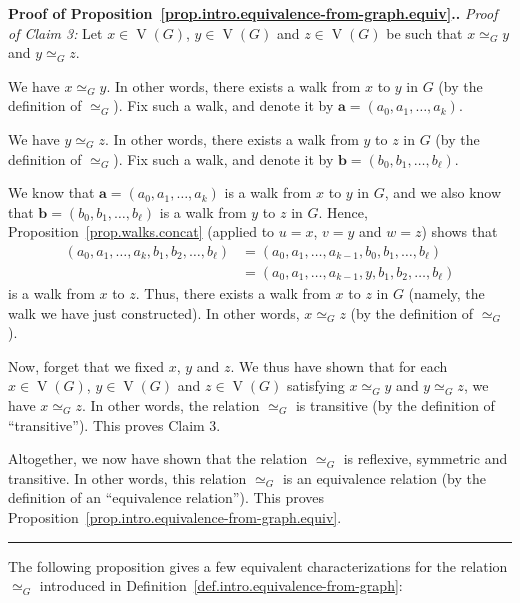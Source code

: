 \documentclass[numbers=enddot,12pt,final,onecolumn,notitlepage]{scrartcl}%
\theoremstyle{definition}
\newenvironment{proof}[1][Proof]{\noindent\textbf{#1.} }{\ \rule{0.5em}{0.5em}}
\newcommand{\tup}[1]{\left( #1 \right)}
\newcommand{\verts}[1]{\operatorname{V}\left( #1 \right)}
\begin{document}
\begin{proof}[Proof of
Proposition~\ref{prop.intro.equivalence-from-graph.equiv}.]
\textit{Proof of Claim 3:} Let $x \in \verts{G}$, $y \in \verts{G}$
and $z \in \verts{G}$ be such that $x \simeq_G y$ and
$y \simeq_G z$.

We have $x \simeq_G y$. In other words, there exists a walk from $x$
to $y$ in $G$ (by the definition of $\simeq_G$). Fix such a walk, and
denote it by $\mathbf{a} = \tup{a_0, a_1, \ldots, a_k}$.

We have $y \simeq_G z$. In other words, there exists a walk from $y$
to $z$ in $G$ (by the definition of $\simeq_G$). Fix such a walk, and
denote it by $\mathbf{b} = \tup{b_0, b_1, \ldots, b_\ell}$.

We know that $\mathbf{a} = \tup{a_0, a_1, \ldots, a_k}$ is a walk from
$x$ to $y$ in $G$, and we also know that
$\mathbf{b} = \tup{b_0, b_1, \ldots, b_\ell}$ is a walk from $y$ to
$z$ in $G$. Hence, Proposition~\ref{prop.walks.concat} (applied to
$u = x$, $v = y$ and $w = z$) shows that
\begin{align*}
\tup{a_0, a_1, \ldots, a_k, b_1, b_2, \ldots, b_\ell}
&= \tup{a_0, a_1, \ldots, a_{k-1}, b_0, b_1, \ldots, b_\ell} \\
&= \tup{a_0, a_1, \ldots, a_{k-1}, y, b_1, b_2, \ldots, b_\ell}
\end{align*}
is a walk from $x$ to $z$. Thus, there exists a walk from $x$ to $z$
in $G$ (namely, the walk we have just constructed). In other words,
$x \simeq_G z$ (by the definition of $\simeq_G$).

Now, forget that we fixed $x$, $y$ and $z$. We thus have shown that
for each $x \in \verts{G}$, $y \in \verts{G}$ and $z \in \verts{G}$
satisfying $x \simeq_G y$ and $y \simeq_G z$, we have $x \simeq_G z$.
In other words, the relation $\simeq_G$ is transitive (by the
definition of ``transitive''). This proves Claim 3.

Altogether, we now have shown that the relation $\simeq_G$ is
reflexive, symmetric and transitive. In other words, this relation
$\simeq_G$ is an equivalence relation (by the definition of an
``equivalence relation'').
This proves Proposition~\ref{prop.intro.equivalence-from-graph.equiv}.
\end{proof}

The following proposition gives a few equivalent characterizations for
the relation $\simeq_G$ introduced in
Definition~\ref{def.intro.equivalence-from-graph}:
\end{document}
